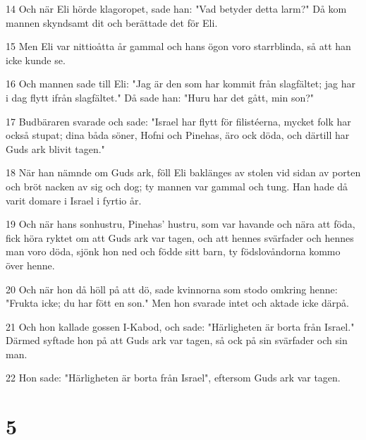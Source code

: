 \par 14 Och när Eli hörde klagoropet, sade han: "Vad betyder detta larm?" Då kom mannen skyndsamt dit och berättade det för Eli.
\par 15 Men Eli var nittioåtta år gammal och hans ögon voro starrblinda, så att han icke kunde se.
\par 16 Och mannen sade till Eli: "Jag är den som har kommit från slagfältet; jag har i dag flytt ifrån slagfältet." Då sade han: "Huru har det gått, min son?"
\par 17 Budbäraren svarade och sade: "Israel har flytt för filistéerna, mycket folk har också stupat; dina båda söner, Hofni och Pinehas, äro ock döda, och därtill har Guds ark blivit tagen."
\par 18 När han nämnde om Guds ark, föll Eli baklänges av stolen vid sidan av porten och bröt nacken av sig och dog; ty mannen var gammal och tung. Han hade då varit domare i Israel i fyrtio år.
\par 19 Och när hans sonhustru, Pinehas' hustru, som var havande och nära att föda, fick höra ryktet om att Guds ark var tagen, och att hennes svärfader och hennes man voro döda, sjönk hon ned och födde sitt barn, ty födslovåndorna kommo över henne.
\par 20 Och när hon då höll på att dö, sade kvinnorna som stodo omkring henne: "Frukta icke; du har fött en son." Men hon svarade intet och aktade icke därpå.
\par 21 Och hon kallade gossen I-Kabod, och sade: "Härligheten är borta från Israel." Därmed syftade hon på att Guds ark var tagen, så ock på sin svärfader och sin man.
\par 22 Hon sade: "Härligheten är borta från Israel", eftersom Guds ark var tagen.

\chapter{5}

